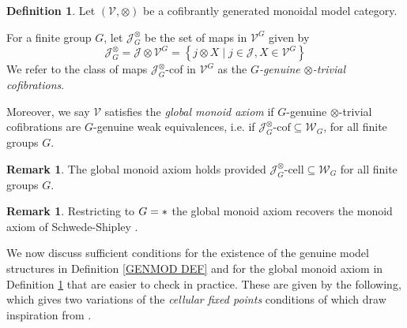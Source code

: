 \documentclass[a4paper,10pt
,draft
]{article}%
\numberwithin{equation}{section}
\numberwithin{figure}{section}
\theoremstyle{definition} %
\newtheorem{definition}[equation]{Definition}%
\newtheorem{remark}[equation]{Remark}%
\newcommand{\sets}[2]{\left\{ #1 \;|\; #2\right\}}%
\newcommand{\V}{\ensuremath{\mathcal V}}
\newcommand{\1}{\ensuremath{\mathbbm 1}}%
\begin{document}
\begin{definition}\label{GLOBMONAX_DEF}
	Let $(\V,\otimes)$ 
	be a cofibrantly generated monoidal model category.
		
	For a finite group $G$, let $\mathcal{J}^{\otimes}_G$ be the set of
	maps in $\V^G$ given by 
\[
\mathcal{J}^{\otimes}_G
=
\mathcal J \otimes \V^G
=
\sets{j \otimes X}{j \in \mathcal{J},X \in \V^G}
\]
We refer to the class of maps  
$\mathcal{J}^{\otimes}_G$-cof in $\V^G$
as the \emph{$G$-genuine $\otimes$-trivial cofibrations}.

Moreover, we say $\V$ satisfies the \textit{global monoid axiom} if
$G$-genuine $\otimes$-trivial cofibrations are $G$-genuine weak equivalences,
i.e. if $\mathcal J^{\otimes}_G \text{-cof} \subseteq \mathcal W_G$,
for all finite groups $G$.
\end{definition}



\begin{remark}
	The global monoid axiom holds provided
	$\mathcal J^{\otimes}_G \text{-cell} \subseteq \mathcal W_G$
	for all finite groups $G$.
\end{remark}


\begin{remark}\label{MONAX_REM}
	Restricting to $G = \**$ the global monoid axiom  
	recovers the monoid axiom of Schwede-Shipley \cite{SS00}.
\end{remark}



We now discuss sufficient conditions 
for the existence of the genuine model structures in 
Definition \ref{GENMOD DEF}
and for the global monoid axiom in 
Definition \ref{GLOBMONAX_DEF}
that are easier to check in practice.
These are given by the following,
which gives two variations of the 
\emph{cellular fixed points} conditions of
\cite[Prop. 2.6]{Ste16}
which draw inspiration from \cite[Remark 2.7]{Ste16}.
\end{document}
